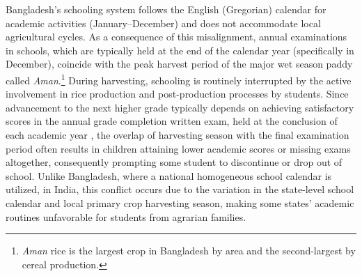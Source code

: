 \documentclass[12pt,letterpaper]{article}
\newcommand{\0}{\ensuremath{\mbox{\boldmath $0$}}}
\begin{document}
Bangladesh’s schooling system follows the English (Gregorian) calendar for academic activities (January–December) and does not accommodate local agricultural cycles. As a consequence of this misalignment, annual examinations in schools, which are typically held at the end of the calendar year (specifically in December), coincide with the peak harvest period of the major wet season paddy called \textit{Aman}.\footnote{\textit{Aman} rice is the largest crop in Bangladesh by area and the second-largest by cereal production.} During harvesting, schooling is routinely interrupted by the active involvement in rice production and post-production processes by students. Since advancement to the next higher grade typically depends on achieving satisfactory scores in the annual grade completion written exam, held at the conclusion of each academic year \citep{ADB2017}, the overlap of harvesting season with the final examination period often results in children attaining lower academic scores or missing exams altogether, consequently prompting some student to discontinue or drop out of school. Unlike Bangladesh, where a national homogeneous school calendar is utilized, in India, this conflict occurs due to the variation in the state-level school calendar and local primary crop harvesting season, making some states' academic routines unfavorable for students from agrarian families. 

\end{document}
